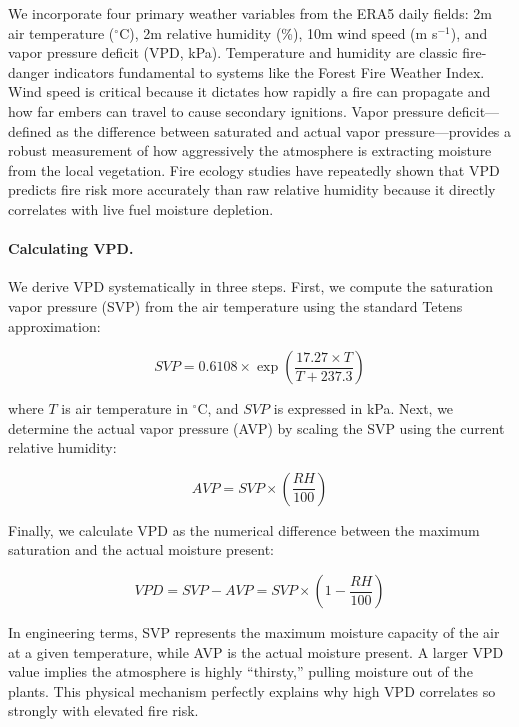 We incorporate four primary weather variables from the ERA5 daily fields: 2m air temperature ($^\circ$C), 2m relative humidity (\%), 10m wind speed (m s$^{-1}$), and vapor pressure deficit (VPD, kPa). Temperature and humidity are classic fire-danger indicators fundamental to systems like the Forest Fire Weather Index. Wind speed is critical because it dictates how rapidly a fire can propagate and how far embers can travel to cause secondary ignitions. Vapor pressure deficit---defined as the difference between saturated and actual vapor pressure---provides a robust measurement of how aggressively the atmosphere is extracting moisture from the local vegetation. Fire ecology studies have repeatedly shown that VPD predicts fire risk more accurately than raw relative humidity because it directly correlates with live fuel moisture depletion.

\medskip
\paragraph{Calculating VPD.} We derive VPD systematically in three steps. First, we compute the saturation vapor pressure (SVP) from the air temperature using the standard Tetens approximation:

\begin{equation}
SVP = 0.6108 \times \exp\left(\frac{17.27 \times T}{T + 237.3}\right)
\end{equation}

where $T$ is air temperature in $^\circ$C, and $SVP$ is expressed in kPa. Next, we determine the actual vapor pressure (AVP) by scaling the SVP using the current relative humidity:

\begin{equation}
AVP = SVP \times \left(\frac{RH}{100}\right)
\end{equation}

Finally, we calculate VPD as the numerical difference between the maximum saturation and the actual moisture present:

\begin{equation}
VPD = SVP - AVP = SVP \times \left(1 - \frac{RH}{100}\right)
\end{equation}

In engineering terms, SVP represents the maximum moisture capacity of the air at a given temperature, while AVP is the actual moisture present. A larger VPD value implies the atmosphere is highly ``thirsty,'' pulling moisture out of the plants. This physical mechanism perfectly explains why high VPD correlates so strongly with elevated fire risk.

